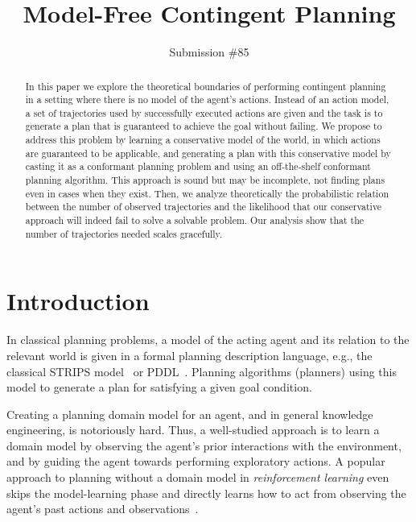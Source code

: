 \documentclass[letterpaper]{article}
\newcommand{\commenter}[2]{\red{[\uppercase{#1}]:{#2}]}}
\newcommand{\roni}[1]{\commenter{roni}{#1}}
\begin{document}
\title{Model-Free Contingent Planning}

\author{Submission \#85}

\maketitle

\begin{abstract}%
In this paper we explore the theoretical boundaries of 
performing contingent planning in a setting where 
there is no model of the agent's actions. 
Instead of an action model, a set of trajectories used by successfully executed actions are given and the task is to generate a plan that is guaranteed
to achieve the goal without failing. 
We propose to address this problem by learning a conservative model of the world, in which actions are guaranteed to be applicable, and generating a plan with this conservative model by casting it as a conformant planning problem and using an off-the-shelf conformant planning algorithm. This approach is sound but may be incomplete, not finding plans even in cases when they exist. 
Then, we analyze theoretically the probabilistic relation between the number of observed trajectories and the likelihood that our conservative approach will indeed fail to solve a solvable problem. Our analysis show that the number of trajectories needed scales gracefully. 
\end{abstract}


\section{Introduction}
In classical planning problems, a model of the acting agent and its relation to the relevant world is given in a formal planning description language, e.g., the classical STRIPS model~\cite{fikes1971strips} or PDDL~\cite{mcdermott1998pddl}. Planning algorithms (planners) using this model to generate a plan for satisfying a given goal condition. 

Creating a planning domain model for an agent, and in general knowledge engineering, is notoriously hard. %
Thus, a well-studied approach is to learn a domain model by observing the agent's prior interactions with the environment, and by guiding the agent towards performing exploratory actions. A popular approach to planning without a domain model in {\em reinforcement learning} even skips the model-learning phase and directly learns how to act from observing the agent's past actions and observations~\cite[e.g.]{kearns2002}.  
\end{document}
